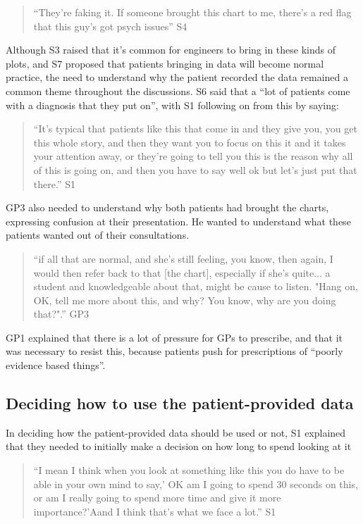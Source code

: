 \documentclass{sigchi}
\begin{document}
\begin{quote}
    ``They're faking it. If someone brought this chart to me, there's a red flag that this guy's got psych issues'' S4
\end{quote}

Although S3 raised that it's common for engineers to bring in these kinds of plots, and S7 proposed that patients bringing in data will become normal practice, the need to understand why the patient recorded the data remained a common theme throughout the discussions. S6 said that a ``lot of patients come with a diagnosis that they put on'', with S1 following on from this by saying:

\begin{quote}
    ``It's typical that patients like this that come in and they give you, you get this whole story, and then they want you to focus on this it and it takes your attention away, or they're going to tell you this is the reason why all of this is going on, and then you have to say well ok but let's just put that there.'' S1
\end{quote}

GP3 also needed to understand why both patients had brought the charts, expressing confusion at their presentation. He wanted to understand what these patients wanted out of their consultations.

\begin{quote}
    ``if all that are normal, and she's still feeling, you know, then again, I would then refer back to that [the chart], especially if she's quite... a student and knowledgeable about that, might be cause to listen. "Hang on, OK, tell me more about this, and why? You know, why are you doing that?".'' GP3
\end{quote}

GP1 explained that there is a lot of pressure for GPs to prescribe, and that it was necessary to resist this, because patients push for prescriptions of ``poorly evidence based things''. 

\subsection{Deciding how to use the patient-provided data}

In deciding how the patient-provided data should be used or not, S1 explained that they needed to initially make a decision on how long to spend looking at it

\begin{quote}
``I mean I think when you look at something like this you do have to be able in your own mind to say,' OK am I going to spend 30 seconds on this, or am I really going to spend more time and give it more importance?'Aand I think that's what we face a lot.'' S1
\end{quote}
\end{document}
